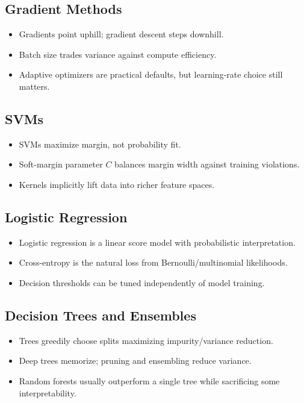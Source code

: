 \documentclass[10pt,twocolumn]{article}
\begin{document}
\subsection{Gradient Methods}
\begin{itemize}
  \item Gradients point uphill; gradient descent steps downhill.
  \item Batch size trades variance against compute efficiency.
  \item Adaptive optimizers are practical defaults, but learning-rate choice still matters.
\end{itemize}

\subsection{SVMs}
\begin{itemize}
  \item SVMs maximize margin, not probability fit.
  \item Soft-margin parameter $C$ balances margin width against training violations.
  \item Kernels implicitly lift data into richer feature spaces.
\end{itemize}

\subsection{Logistic Regression}
\begin{itemize}
  \item Logistic regression is a linear score model with probabilistic interpretation.
  \item Cross-entropy is the natural loss from Bernoulli/multinomial likelihoods.
  \item Decision thresholds can be tuned independently of model training.
\end{itemize}

\subsection{Decision Trees and Ensembles}
\begin{itemize}
  \item Trees greedily choose splits maximizing impurity/variance reduction.
  \item Deep trees memorize; pruning and ensembling reduce variance.
  \item Random forests usually outperform a single tree while sacrificing some interpretability.
\end{itemize}
\end{document}
